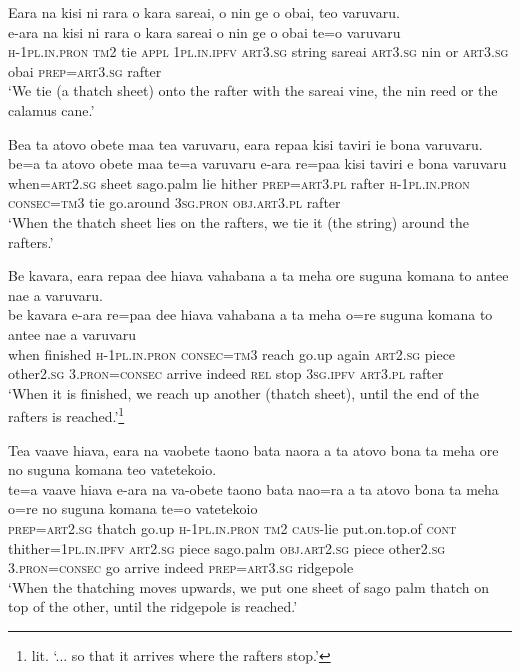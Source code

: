 \ea\label{ex:text12-38}
Eara na kisi ni rara o kara sareai, o nin ge o obai, teo varuvaru.\\
\gll e-ara	na	kisi	ni	rara	o	kara	sareai	o	nin	ge	o	obai	te=o	varuvaru\\
     \textsc{h}-1\textsc{pl}.\textsc{in}.\textsc{pron}	\textsc{tm}2	tie	\textsc{appl}	1\textsc{pl}.\textsc{in}.\textsc{ipfv}	\textsc{art}3.\textsc{sg}	string	sareai	\textsc{art}3.\textsc{sg}	nin	or	\textsc{art}3.\textsc{sg}	obai	\textsc{prep}=\textsc{art}3.\textsc{sg}	rafter\\
\glt `We tie (a thatch sheet) onto the rafter with the sareai vine, the nin reed or the calamus cane.'
\z

\ea\label{ex:text12-39}
Bea ta atovo obete maa tea varuvaru, eara repaa kisi taviri ie bona varuvaru.\\
\gll be=a	ta	atovo	obete	maa	te=a	varuvaru	e-ara	re=paa	kisi	taviri	e	bona	varuvaru\\
     when=\textsc{art}2.\textsc{sg}	sheet	sago.palm	lie	hither	\textsc{prep}=\textsc{art}3.\textsc{pl}	rafter	\textsc{h}-1\textsc{pl}.\textsc{in}.\textsc{pron}	\textsc{consec}=\textsc{tm}3	tie	go.around	3\textsc{sg}.\textsc{pron}	\textsc{obj}.\textsc{art}3.\textsc{pl}	rafter\\
\glt `When the thatch sheet lies on the rafters, we tie it (the string) around the rafters.'
\z

\newpage
\ea\label{ex:text12-40}
Be kavara, eara repaa dee hiava vahabana a ta meha ore suguna komana to antee nae a varuvaru.\\
\gll be	kavara	e-ara	re=paa	dee	hiava	vahabana	a	ta	meha	o=re	suguna	komana	to	antee	nae	a	varuvaru\\
     when	finished	\textsc{h}-1\textsc{pl}.\textsc{in}.\textsc{pron}	\textsc{consec}=\textsc{tm}3	reach	go.up	again	\textsc{art}2.\textsc{sg}	piece	other2.\textsc{sg}	3.\textsc{pron}=\textsc{consec}	arrive	indeed	\textsc{rel}	stop	3\textsc{sg}.\textsc{ipfv}	\textsc{art}3.\textsc{pl}	rafter\\
\glt `When it is finished, we reach up another (thatch sheet), until the end of the rafters is reached.'\footnote{lit. `... so that it arrives where the rafters stop.'}
\z

\ea\label{ex:text12-41}
Tea vaave hiava, eara na vaobete taono bata naora a ta atovo bona ta meha ore no suguna komana teo vatetekoio.\\
\gll te=a	vaave	hiava	e-ara	na	va-obete	taono	bata	nao=ra	a	ta	atovo	bona	ta	meha	o=re	no	suguna	komana	te=o	vatetekoio\\
     \textsc{prep}=\textsc{art}2.\textsc{sg}	thatch	go.up	\textsc{h}-1\textsc{pl}.\textsc{in}.\textsc{pron}	\textsc{tm}2	\textsc{caus}-lie	put.on.top.of	\textsc{cont}	thither=1\textsc{pl}.\textsc{in}.\textsc{ipfv}	\textsc{art}2.\textsc{sg}	piece	sago.palm	\textsc{obj}.\textsc{art}2.\textsc{sg}	piece	other2.\textsc{sg}	3.\textsc{pron}=\textsc{consec}	go	arrive	indeed	\textsc{prep}=\textsc{art}3.\textsc{sg}	ridgepole\\
\glt `When the thatching moves upwards, we put one sheet of sago palm thatch on top of the other, until the ridgepole is reached.'
\z

